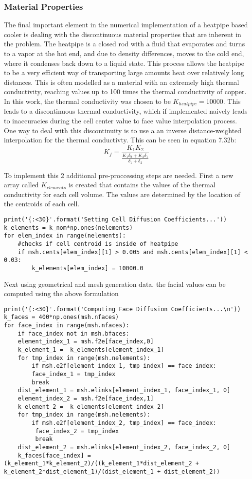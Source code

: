 \documentclass[11pt]{article}
\begin{document}
\subsubsection{Material Properties}
\label{sec:org6c35d19}
The final important element in the numerical implementation of a heatpipe based cooler is dealing with the discontinuous material properties that are inherent in the problem. The heatpipe is a closed rod with a fluid that evaporates and turns to a vapor at the hot end, and due to density differences, moves to the cold end, where it condenses back down to a liquid state. This process allows the heatpipe to be a very efficient way of transporting large amounts heat over relatively long distances. This is often modelled as a material with an extremely high thermal conductivity, reaching values up to 100 times the thermal conductivity of copper. In this work, the thermal conductivity was chosen to be \(K_{heatpipe}=10000\). 
This leads to a discontinuous thermal conductivity, which if implemented naively leads to inaccuracies during the cell center value to face value interpolation process. 
One way to deal with this discontinuity is to use a an inverse distance-weighted interpolation for the thermal conductivty. This can be seen in equation 7.32b:
\[
  K_{f} = \frac{K_{1}K_{2}}{\frac{K_{1}\delta_{2} + K_{2}\delta_{1}}{\delta_{1}+\delta_{2}}}
  \]

To implement this 2 additional pre-proccessing steps are needed. First a new array called \(K_{elements}\) is created that contains the values of the thermal conductivity for each cell volume. The values are determined by the location of the centroids of each cell.
\begin{verbatim}
print('{:<30}'.format('Setting Cell Diffusion Coefficients...'))
k_elements = k_nom*np.ones(nelements)
for elem_index in range(nelements): 
    #checks if cell centroid is inside of heatpipe
    if msh.cents[elem_index][1] > 0.005 and msh.cents[elem_index][1] < 0.03:
	    k_elements[elem_index] = 10000.0
\end{verbatim}
Next using geometrical and mesh generation data, the facial values can be computed using the above formulation
\begin{verbatim}
print('{:<30}'.format('Computing Face Diffusion Coefficients...\n'))
k_faces = 400*np.ones(msh.nfaces)
for face_index in range(msh.nfaces):
    if face_index not in msh.bfaces:
	element_index_1 = msh.f2e[face_index,0]
	k_element_1 =  k_elements[element_index_1]
	for tmp_index in range(msh.nelements):
	    if msh.e2f[element_index_1, tmp_index] == face_index:
		face_index_1 = tmp_index
		break
	dist_element_1 = msh.elinks[element_index_1, face_index_1, 0]
	element_index_2 = msh.f2e[face_index,1]
	k_element_2 =  k_elements[element_index_2]
	for tmp_index in range(msh.nelements):
	    if msh.e2f[element_index_2, tmp_index] == face_index:
		 face_index_2 = tmp_index
		 break
	dist_element_2 = msh.elinks[element_index_2, face_index_2, 0]
	k_faces[face_index] = (k_element_1*k_element_2)/((k_element_1*dist_element_2 + k_element_2*dist_element_1)/(dist_element_1 + dist_element_2))
\end{verbatim}
\end{document}
